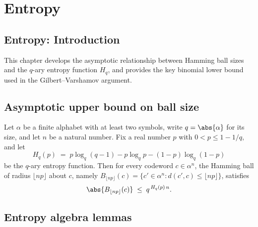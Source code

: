 \section{Entropy}
\subsection*{Entropy: Introduction}

This chapter develops the asymptotic relationship between Hamming ball sizes and the
$q$-ary entropy function $H_q$, and provides the key binomial lower bound used in the
Gilbert--Varshamov argument.

\subsection{Asymptotic upper bound on ball size}

\begin{theorem}
\label{ErrorCorrectingCodes.Codeword.hamming_ball_size_asymptotic_upper_bound}
\leanok
{}
Let $\alpha$ be a finite alphabet with at least two symbols, write $q = \abs{\alpha}$
for its size, and let $n$ be a natural number. Fix a real number $p$ with $0 < p \le 1 -
1/q$, and let
\[
H_q(p) \;=\; p\log_q(q-1) - p\log_q p - (1-p)\log_q(1-p)
\]
be the $q$-ary entropy function. Then for every codeword $c \in \alpha^n$, the Hamming
ball of radius $\lfloor np\rfloor$ about $c$, namely $B_{\lfloor np\rfloor}(c) = \{c'
\in \alpha^n : d(c',c) \le \lfloor np\rfloor\}$, satisfies
\[
\abs{B_{\lfloor np\rfloor}(c)} \;\le\; q^{\,H_q(p)\,n}.
\]
\end{theorem}

\subsection{Entropy algebra lemmas}

